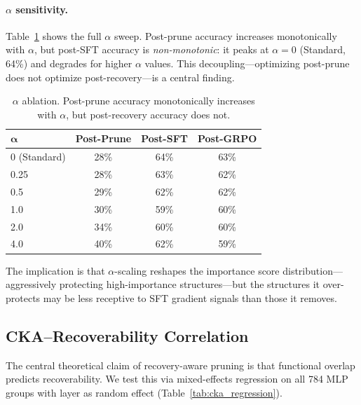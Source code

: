 \documentclass[11pt,a4paper]{article}
\begin{document}
\paragraph{$\alpha$ sensitivity.}
Table~\ref{tab:alpha} shows the full $\alpha$ sweep. Post-prune accuracy increases monotonically with $\alpha$, but post-SFT accuracy is \emph{non-monotonic}: it peaks at $\alpha{=}0$ (Standard, 64\%) and degrades for higher $\alpha$ values. This decoupling---optimizing post-prune does not optimize post-recovery---is a central finding.

\begin{table}[t]
\centering
\small
\begin{tabular}{lccc}
\toprule
$\boldsymbol{\alpha}$ & \textbf{Post-Prune} & \textbf{Post-SFT} & \textbf{Post-GRPO} \\
\midrule
0 (Standard) & 28\% & 64\% & 63\% \\
0.25 & 28\% & 63\% & 62\% \\
0.5 & 29\% & 62\% & 62\% \\
1.0 & 30\% & 59\% & 60\% \\
2.0 & 34\% & 60\% & 60\% \\
4.0 & 40\% & 62\% & 59\% \\
\bottomrule
\end{tabular}
\caption{$\alpha$ ablation. Post-prune accuracy monotonically increases with $\alpha$, but post-recovery accuracy does not.}
\label{tab:alpha}
\end{table}

The implication is that $\alpha$-scaling reshapes the importance score distribution---aggressively protecting high-importance structures---but the structures it over-protects may be less receptive to SFT gradient signals than those it removes.


\subsection{CKA--Recoverability Correlation}
\label{sec:cka_corr}

The central theoretical claim of recovery-aware pruning is that functional overlap predicts recoverability. We test this via mixed-effects regression on all 784 MLP groups with layer as random effect (Table~\ref{tab:cka_regression}).
\end{document}
